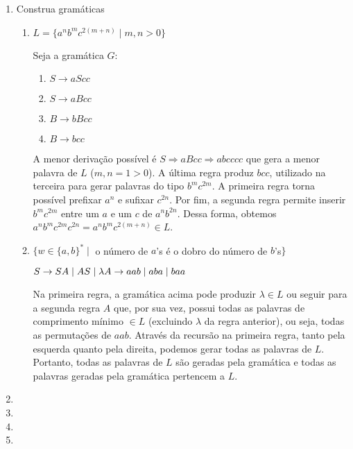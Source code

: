 \documentclass[brazil, a4paper,12pt]{article}
\begin{document}
\begin{enumerate}

\item Construa gramáticas
  \begin{enumerate}
    \item $L = \{a^nb^mc^{2(m+n)} \mid m, n > 0\}$

    Seja a gramática $G$:

    \begin{enumerate}
      \item $S \rightarrow aScc$ \label{regra1a1}
      \item $S \rightarrow aBcc$ \label{regra1a2}
      \item $B \rightarrow bBcc$ \label{regra1a3}
      \item $B \rightarrow bcc$ \label{regra1a4}
    \end{enumerate}

    A menor derivação possível é $S \Rightarrow aBcc \Rightarrow abcccc$ que
    gera a menor palavra de $L$ ($m, n = 1 > 0$). A última regra produz
    $bcc$, utilizado na terceira para gerar palavras do tipo $b^mc^{2m}$. A
    primeira regra torna possível prefixar $a^n$ e sufixar $c^{2n}$. Por
    fim, a segunda regra permite inserir $b^mc^{2m}$ entre um $a$ e um $c$
    de $a^nb^{2n}$. Dessa forma, obtemos $a^nb^mc^{2m}c^{2n} =
    a^nb^mc^{2(m+n)} \in L$.

    \item $\{w \in \{a,b\}^* \mid$ o número de $a$'s é o dobro do número de
    $b$'s$\}$

    $S \rightarrow SA \mid AS \mid \lambda\\
     A \rightarrow aab \mid aba \mid baa$

     Na primeira regra, a gramática acima pode produzir $\lambda \in L$ ou
     seguir para a segunda regra $A$ que, por sua vez, possui todas as palavras
     de comprimento mínimo $\in L$ (excluindo $\lambda$ da regra anterior), ou
     seja, todas as permutações de $aab$. Através da recursão na primeira regra,
     tanto pela esquerda quanto pela direita, podemos gerar todas as palavras de
     $L$.  Portanto, todas as palavras de $L$ são geradas pela gramática e todas
     as palavras geradas pela gramática pertencem a $L$.

  \end{enumerate}

\item

\item

\item

\item

\end{enumerate}
\end{document}
